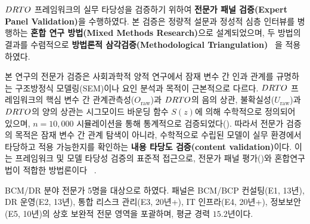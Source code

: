 

\section{}
\label{sec:ch5_expert}

\subsection{}
\label{subsec:ch5_expert_method}

$DRTO$ 프레임워크의 실무 타당성을 검증하기 위하여
\textbf{전문가 패널 검증(Expert Panel Validation)}을 수행하였다.
본 검증은 정량적 설문과 정성적 심층 인터뷰를 병행하는
\textbf{혼합 연구 방법(Mixed Methods Research)}으로 설계되었으며,
두 방법의 결과를 수렴적으로 
\textbf{방법론적 삼각검증(Methodological Triangulation)}%
~\citep{creswell2018designing, denzin1978research}을 적용하였다.

본 연구의 전문가 검증은 사회과학적 양적 연구에서 잠재 변수 간
인과 관계를 규명하는 구조방정식 모델링(SEM)이나 
요인 분석과 목적이 근본적으로 다르다.
$DRTO$ 프레임워크의 핵심 변수 간 관계\chg{(}관측성($O_{\text{raw}}$)과
$DRTO$의 음의 상관, 불확실성($U_{\text{raw}}$)과 $DRTO$의 양의 상관\chg{)}는
시그모이드 바운딩 함수 $S(z)$에 의해 수학적으로 정의되어 있으며,
$n = 10{,}000$ 시뮬레이션을 통해 통계적으로 검증되었다().
따라서 전문가 검증의 목적은 잠재 변수 간 관계 탐색이 아니라,
수학적으로 수립된 모델이 실무 환경에서 타당하고 적용 가능한지를
확인하는 \textbf{내용 타당도 검증(content validation)}이다.
이는 프레임워크 및 모델 타당성 검증의 표준적 접근으로,
전문가 패널 평가()와 혼합연구법이 적합한 방법론이다%
~\citep{lynn1986determination}.

BCM/DR 분야 전문가 5명을 대상으로 하였다.
패널은 BCM/BCP 컨설팅(E1, 13년), DR 운영(E2, 13년),
통합 리스크 관리(E3, 20년+), IT 인프라(E4, 20년+),
정보보안(E5, 10년)의 상호 보완적 전문 영역을 포괄하며,
평균 경력 $15.2$년이다.



